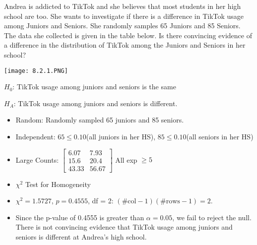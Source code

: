 \documentclass[../stats.tex]{subfiles}
\begin{document}
\begin{example}
    Andrea is addicted to TikTok and she believes that most students in her high school are too. She wants to investigate if there is a difference in TikTok usage among Juniors and Seniors.
    She randomly samples 65 Juniors and 85 Seniors. The data she collected is given in the table below. Is there convincing evidence of a difference in the distribution of TikTok among the Juniors and Seniors in her school?

    \begin{center}
        \texttt{[image: 8.2.1.PNG]}
    \end{center}

    $H_0$: TikTok usage among juniors and seniors is the same 

    $H_A$: TikTok usage among juniors and seniors is different.

    \begin{itemize}
        \item Random: Randomly sampled 65 juniors and 85 seniors.
        \item Independent: $65\leq 0.10$(all juniors in her HS), $85\leq 0.10$(all seniors in her HS)
        \item Large Counts: 
        $\begin{bmatrix}
            6.07 & 7.93 \\
            15.6 & 20.4 \\
            43.33 & 56.67
        \end{bmatrix}$
        All exp $\geq 5$

        \item $\chi^2$ Test for Homogeneity
        \item $\chi^2=1.5727$, $p=0.4555$, df = 2: $(\#\text{col}-1)(\#\text{rows}-1)=2$.
        \item Since the p-value of 0.4555 is greater than $\alpha=0.05$, we fail to reject the null. There is not convincing evidence that TikTok usage among juniors and seniors is different at Andrea's high school.
    \end{itemize}
\end{example}
\pagebreak
\end{document}
